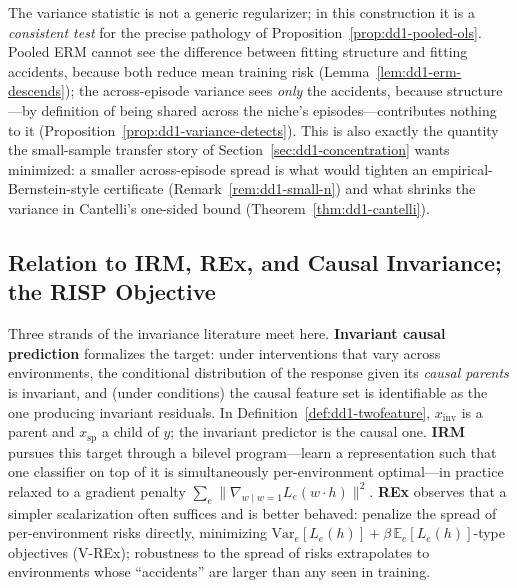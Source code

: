 \documentclass[11pt,a4paper]{article}
\theoremstyle{definition}
\theoremstyle{plain}
\newcommand{\E}{\mathbb{E}}
\newcommand{\nm}{\textsc{RISP}}
\begin{document}
\begin{keypoint}
The variance statistic is not a generic regularizer; in this construction it
is a \emph{consistent test} for the precise pathology of
Proposition~\ref{prop:dd1-pooled-ols}. Pooled ERM cannot see the difference
between fitting structure and fitting accidents, because both reduce mean
training risk (Lemma~\ref{lem:dd1-erm-descends}); the across-episode variance
sees \emph{only} the accidents, because structure---by definition of being
shared across the niche's episodes---contributes nothing to it
(Proposition~\ref{prop:dd1-variance-detects}). This is also exactly the
quantity the small-sample transfer story of
Section~\ref{sec:dd1-concentration} wants minimized: a smaller
across-episode spread is what would tighten an empirical-Bernstein-style
certificate (Remark~\ref{rem:dd1-small-n}) and what shrinks the variance in
Cantelli's one-sided bound (Theorem~\ref{thm:dd1-cantelli}).
\end{keypoint}

\subsection{Relation to IRM, REx, and Causal Invariance; the \nm{} Objective}

Three strands of the invariance literature meet here.
\textbf{Invariant causal prediction} \cite{peters2016causal} formalizes the
target: under interventions that vary across environments, the conditional
distribution of the response given its \emph{causal parents} is invariant,
and (under conditions) the causal feature set is identifiable as the one
producing invariant residuals. In Definition~\ref{def:dd1-twofeature},
$x_{\mathrm{inv}}$ is a parent and $x_{\mathrm{sp}}$ a child of $y$; the
invariant predictor is the causal one.
\textbf{IRM} \cite{arjovsky2019irm} pursues this target through a bilevel
program---learn a representation such that one classifier on top of it is
simultaneously per-environment optimal---in practice relaxed to a gradient
penalty $\sum_e \|\nabla_{w \mid w = 1} L_e(w \cdot h)\|^2$.
\textbf{REx} \cite{krueger2021rex} observes that a simpler scalarization
often suffices and is better behaved: penalize the spread of per-environment
risks directly, minimizing
$\mathrm{Var}_e[L_e(h)] + \beta\, \E_e[L_e(h)]$-type objectives (V-REx);
robustness to the spread of risks extrapolates to environments whose
``accidents'' are larger than any seen in training.
\end{document}
